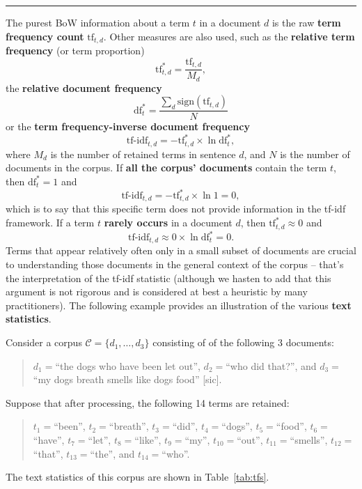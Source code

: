 \begin{center}\rule{0.5\linewidth}{.4pt}\end{center}
The purest BoW information about a term $t$ in a document $d$ is the raw \textbf{term frequency count} $\textrm{tf}_{t,d}$. Other measures are also used, such as the \textbf{relative term frequency}  (or term proportion) $$\textrm{tf}^*_{t,d}=\frac{\textrm{tf}_{t,d}}{M_{d}},$$ the \textbf{relative document frequency} $$\textrm{df}^*_{t}=\frac{\sum_d\textrm{sign}\left(\textrm{tf}_{t,d}\right)}{N}$$ or the \textbf{term frequency-inverse document frequency} $$\textrm{tf-idf}_{t,d}=-\textrm{tf}^*_{t,d}\times \ln \textrm{df}^*_{t},$$ where $M_d$ is the number of retained terms in sentence $d$, and $N$ is the number of documents in the corpus. 
If \textbf{all the corpus' documents} contain the term $t$, then $\textrm{df}^*_{t}=1$ and $$\textrm{tf-idf}_{t,d} = -\textrm{tf}^*_{t,d}\times \ln 1 =0,$$ which is to say that this specific term does not provide information in the tf-idf framework. If a term $t$ \textbf{rarely occurs} in a document $d$, then  $\textrm{tf}^*_{t,d}\approx 0$ and $$\textrm{tf-idf}_{t,d} \approx 0 \times \ln \textrm{df}^*_{t} =0.$$ Terms that appear relatively often only in a small subset of documents are crucial to understanding those documents in the general context of the corpus -- that's the interpretation of the tf-idf statistic (although we hasten to add that this argument is not rigorous and is considered at best a heuristic by many practitioners). 
\newl The following example provides an illustration of the various \textbf{text statistics}. 
\par Consider a corpus $\mathcal{C}=\{d_1,\ldots,d_3\}$ consisting of of the following 3 documents:\begin{quote} $d_1=$``the dogs who have been let out'', $d_2=$``who did that?'', and $d_3=$``my dogs breath smells like dogs food'' [sic].\end{quote} Suppose that after processing, the following 14 terms are retained: 
\begin{quote}
$t_1=$``been'', $t_2=$``breath'', $t_3=$``did'', $t_4=$``dogs'', $t_5=$``food'', $t_6=$``have'', $t_7=$``let'', $t_8=$``like'', $t_9=$``my'', $t_{10}=$``out'', $t_{11}=$``smells'', $t_{12}=$``that'', $t_{13}=$``the'', and $t_{14}=$``who''. 
\end{quote}
\newpage\noindent The text statistics of this corpus are shown in Table~\ref{tab:tfs}.
